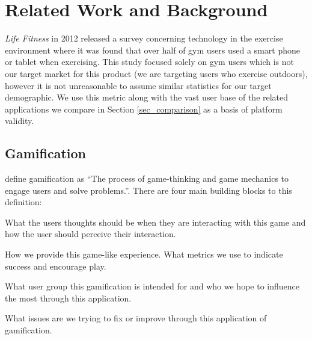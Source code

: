 \chapter{Related Work and Background}\label{ch_background}

\emph{Life Fitness} in 2012 released a survey concerning technology in the
exercise environment\cite{lifefitness} where it was found that over
half of gym users used a smart phone or tablet when exercising. This
study focused solely on gym users which is not our target market for
this product (we are targeting users who exercise outdoors), however
it is not unreasonable to assume similar statistics for our target
demographic. We use this metric along with the vast user base of the
related applications we compare in Section \ref{sec_comparison} as a
basis of platform validity. 

\section{Gamification}
\citet{gamification_book} define gamification as ``The process of
game-thinking and game mechanics to engage users and solve
problems.''. There are four main building blocks to this definition:

\begin{description}[style=multiline, leftmargin=3cm]
\item[\emph{game-thinking}] What the users thoughts should be when
  they are interacting with this game and how the user should perceive
  their interaction.
\item[\emph{game mechanics}] How we provide this game-like
  experience. What metrics we use to indicate success and encourage
  play. 
\item[\emph{users}] What user group this gamification is intended for
  and who we hope to influence the most through this application.
\item[\emph{problems}] What issues are we trying to fix or improve
  through this application of gamification.
\end{description}

